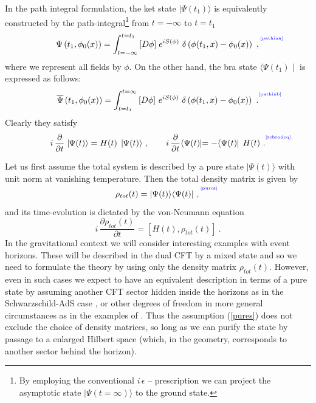\documentclass[12pt]{article}
\newcommand{\be}{\begin{equation}}
\newcommand{\ee}{\end{equation}}
\def\eps{\epsilon}
\def\p{\partial}
\def\p{\partial}
\def\f#1#2{{\frac{#1}{#2}}}
\def\f#1#2{{\frac{#1}{#2}}}
\def\p{\partial}
\def\ket#1{\mid  \! \! #1   \rangle}
\def\bra#1{\langle   #1 \! \! \mid}
\def\Label#1{\label{#1}%
{ \color{blue}{\smash{\hbox to0pt{\raise2ex\hbox{\tiny[#1]}\hss}}}}}
\def\f {\frac}
\begin{document}
In the path integral formulation, the ket state $\ket{\Psi(t_1)}$
is equivalently constructed by the path-integral\footnote{By
employing the conventional $i \, \eps$ -- prescription we can project the
asymptotic state $\ket{\Psi(t=\infty)}$ to the ground state.} from
$t=-\infty$ to $t=t_1$
%
\begin{equation}
\Psi\left(t_1,\phi_0(x)\right)= \int^{t=t_1}_{t=-\infty} \,[D\phi]\;
e^{iS(\phi)}~\delta\left(\phi(t_1,x)-\phi_0(x)\right) \ ,
\Label{pathina}
\end{equation}
%
 where we represent all fields by $\phi$. On the
other hand, the bra state $\bra{\Psi(t_1)}$ is expressed as
follows:
%
\begin{equation}
 \overline{\Psi}\left(t_1,\phi_0(x)\right)=
\int^{t=\infty}_{t=t_1} \, [D\phi] ~ e^{iS(\phi)}~
\delta\left(\phi(t_1,x)-\phi_0(x)\right) \ . \Label{pathinb}
\end{equation}
%
Clearly they satisfy
%
\begin{equation}
i\, \frac{\p}{\p t}\ket{\Psi(t)}=H(t) \, \ket{\Psi(t)} \ ,\qquad
i\, \frac{\p}{\p t}\bra{\Psi(t)}=-\bra{\Psi(t)} \, H(t) \ .
\Label{schrodeq}
\end{equation}
%

Let us first assume the total system is described by a pure state
$\ket{\Psi(t)}$ with unit norm  at vanishing
temperature.  Then the total density matrix is given by
%
\begin{equation}
\rho_{tot}(t)=|\Psi(t)\rangle \langle\Psi(t)| \ ,\Label{pures}
\end{equation}
%
and its time-evolution is dictated by the von-Neumann equation
%
\be
i\,\f{\p \rho_{tot}(t)}{\p t}=[H(t),\rho_{tot}(t)] \ . \ee
%
In the gravitational context we will consider interesting examples
with event horizons. These will be described in the dual CFT by a
mixed state and so  we need to formulate the theory by using only
the density matrix $\rho_{tot}(t)$. However, even in such  cases we
expect to have an equivalent description in terms of a pure state by
assuming another CFT sector hidden inside the horizons as in the
Schwarzschild-AdS case \cite{Maldacena:2001kr}, or other degrees of
freedom in more general circumstances as in the examples of
\cite{Freivogel:2005qh}.  Thus the assumption (\ref{pures}) does not
exclude the choice of density matrices, so long as we can purify the
state by passage to a enlarged Hilbert space (which, in the
geometry, corresponds to another sector behind the horizon).
\end{document}
